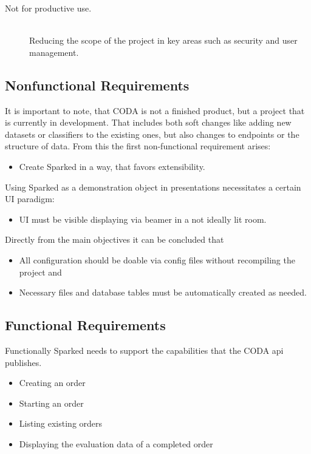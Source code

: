 \begin{description}
\item [Not for productive use.]\hfill \\
Reducing the scope of the project in key areas such as security and user management.
\end{description}

\subsection{Nonfunctional Requirements}
It is important to note, that CODA is not a finished product, but a project that is currently in development. That includes both soft changes like adding new datasets or classifiers to the existing ones, but also changes to endpoints or the structure of data. From this the first non-functional requirement arises:

\begin{itemize}
\item Create Sparked in a way, that favors extensibility.
\end{itemize}

Using Sparked as a demonstration object in presentations necessitates a certain UI paradigm:
\begin{itemize}
\item UI must be visible displaying via beamer in a not ideally lit room.
\end{itemize}
Directly from the main objectives it can be concluded that
\begin{itemize}
\item All configuration should be doable via config files without recompiling the project and
\item Necessary files and database tables must be automatically created as needed.
\end{itemize}

\subsection{Functional Requirements}
Functionally Sparked needs to support the capabilities that the CODA api publishes. 
\begin{itemize}
\item	Creating an order
\item	Starting an order
\item	Listing existing orders
\item	Displaying the evaluation data of a completed order
\end{itemize}


